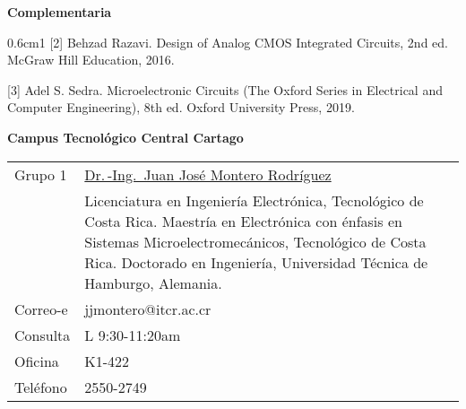 \documentclass[11pt,oneside,letterpaper]{article}
\begin{document}
\textbf{Complementaria}

\begin{hangparas}{0.6cm}{1}
[2] Behzad Razavi. Design of Analog CMOS Integrated Circuits, 2nd ed. McGraw Hill Education, 2016.

[3] Adel S. Sedra. Microelectronic Circuits (The Oxford Series in Electrical and Computer Engineering), 8th ed. Oxford University Press, 2019.
\end{hangparas}


%
\textbf{Campus Tecnológico Central Cartago}

\begin{tabular}{lp{106mm}}
  Grupo 1 & \underline{Dr.\,-Ing.\ Juan José Montero Rodríguez} \\[2mm]
  & Licenciatura en Ingeniería Electrónica, Tecnológico de Costa Rica. Maestría en Electrónica con énfasis en Sistemas Microelectromecánicos, Tecnológico de Costa Rica. Doctorado en Ingeniería, Universidad Técnica de Hamburgo, Alemania.\\
Correo-e & jjmontero@itcr.ac.cr    \\
Consulta & L 9:30-11:20am\\
Oficina  & K1-422 \\
Teléfono & 2550-2749 \\ 
\end{tabular}
\end{document}
